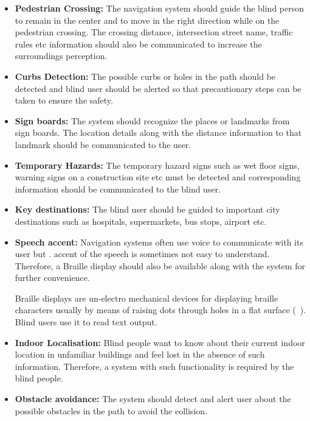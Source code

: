 \begin{itemize}
\item \textbf{Pedestrian Crossing:} 
The navigation system should guide the blind person
to remain in the center and to move in the right direction 
while on the pedestrian crossing. The crossing distance,
intersection street name, traffic rules etc information 
should also be communicated to increase the surroundings 
perception.

\item \textbf{Curbs Detection:}
The possible curbs or holes in the path 
should be detected and blind user should be alerted 
so that  precautionary steps can be taken 
to ensure the safety.  

\item \textbf{Sign boards:}
The system should recognize the places 
or landmarks  from sign boards. The location 
details along with the distance 
information to that landmark 
should be communicated to the user.

\item \textbf{Temporary Hazards:}
The temporary hazard signs such 
as wet floor signs, warning signs 
on a construction site etc must be detected 
and corresponding information 
should be communicated to the 
blind user. 

\item \textbf{Key destinations:}
The blind user should be guided to 
important city destinations such as hospitals, 
supermarkets, bus stops, airport etc.

\item \textbf{Speech accent:}
Navigation systems often use voice 
to communicate with its user but .
accent of the speech is sometimes 
not easy to understand. Therefore, a Braille display 
should also be available along 
with the system for further convenience.   

Braille displays are un-electro mechanical devices 
for displaying braille characters usually by means of 
raising dots through holes in a flat surface (~\citet{braille12}). 
Blind users use it to read text output.

\item \textbf{Indoor Localisation:}
Blind people want to know about 
their current indoor location in unfamiliar 
buildings and feel lost in the absence of such information. 
Therefore, a system with such functionality 
is required by the blind people. 

\item \textbf{Obstacle avoidance:}
The system should detect and alert user about 
the possible obstacles in the path to avoid the collision. 


\end{itemize}

